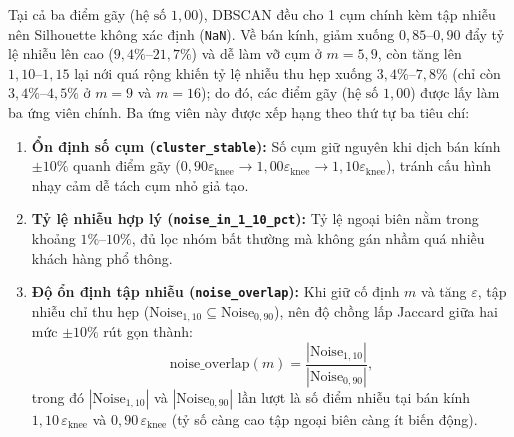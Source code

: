 \documentclass[12pt,a4paper]{article}
\numberwithin{equation}{section}
\numberwithin{table}{section}
\numberwithin{figure}{section}
\begin{document}
Tại cả ba điểm gãy ($\text{hệ số } 1,00$), DBSCAN đều cho 1 cụm chính kèm tập nhiễu nên Silhouette không xác định (\texttt{NaN}). Về bán kính, giảm xuống $0,85\text{--}0,90$ đẩy tỷ lệ nhiễu lên cao ($9,4\%\text{--}21,7\%$) và dễ làm vỡ cụm ở $m = 5, 9$, còn tăng lên $1,10\text{--}1,15$ lại nới quá rộng khiến tỷ lệ nhiễu thu hẹp xuống $3,4\%\text{--}7,8\%$ (chỉ còn $3,4\%\text{--}4,5\%$ ở $m = 9$ và $m = 16$); do đó, các điểm gãy ($\text{hệ số } 1,00$) được lấy làm ba ứng viên chính. Ba ứng viên này được xếp hạng theo thứ tự ba tiêu chí:
\begin{enumerate}[leftmargin=1.8em]
    \item \textbf{Ổn định số cụm (\texttt{cluster\_stable}):} Số cụm giữ nguyên khi dịch bán kính $\pm 10\%$ quanh điểm gãy ($0,90\varepsilon_{\text{knee}} \to 1,00\varepsilon_{\text{knee}} \to 1,10\varepsilon_{\text{knee}}$), tránh cấu hình nhạy cảm dễ tách cụm nhỏ giả tạo.
    \item \textbf{Tỷ lệ nhiễu hợp lý (\texttt{noise\_in\_1\_10\_pct}):} Tỷ lệ ngoại biên nằm trong khoảng $1\%\text{--}10\%$, đủ lọc nhóm bất thường mà không gán nhầm quá nhiều khách hàng phổ thông.
    \item \textbf{Độ ổn định tập nhiễu (\texttt{noise\_overlap}):} Khi giữ cố định $m$ và tăng $\varepsilon$, tập nhiễu chỉ thu hẹp ($\mathrm{Noise}_{1,10} \subseteq \mathrm{Noise}_{0,90}$), nên độ chồng lấp Jaccard giữa hai mức $\pm 10\%$ rút gọn thành:
    \begin{equation}
        \mathrm{noise\_overlap}(m) = \frac{|\mathrm{Noise}_{1,10}|}{|\mathrm{Noise}_{0,90}|},
        \label{eq:noise_overlap}
    \end{equation}
    trong đó $|\mathrm{Noise}_{1,10}|$ và $|\mathrm{Noise}_{0,90}|$ lần lượt là số điểm nhiễu tại bán kính $1,10\,\varepsilon_{\text{knee}}$ và $0,90\,\varepsilon_{\text{knee}}$ (tỷ số càng cao tập ngoại biên càng ít biến động).
\end{enumerate}

\begin{table}[H]
\centering
\footnotesize
{}
\caption{Xếp hạng ba ứng viên DBSCAN tại điểm gãy ($\text{hệ số } 1,00$) theo ba tiêu chí ổn định (*cấu hình được chọn).}
\label{tab:dbscan_tuning}
\end{table}
\end{document}
